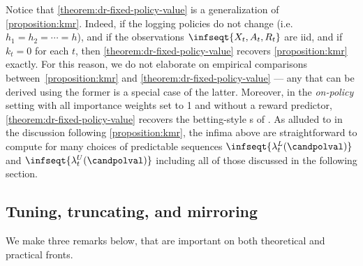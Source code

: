 Notice that \cref{theorem:dr-fixed-policy-value} is a generalization of \cref{proposition:kmr}. Indeed, if the logging policies do not change (i.e.~$h_1=h_2=\cdots=h$), and if the observations $\infseqt{X_t, A_t, R_t}$ are iid, and if $k_t = 0$ for each $t$, then \cref{theorem:dr-fixed-policy-value} recovers \cref{proposition:kmr} exactly. For this reason, we do not elaborate on empirical comparisons between~\cref{proposition:kmr} and \cref{theorem:dr-fixed-policy-value} --- any \cs{} that can be derived using the former is a special case of the latter. Moreover, in the \emph{on-policy} setting with all importance weights set to 1 and without a reward predictor, \cref{theorem:dr-fixed-policy-value} recovers the betting-style \cs{}s of \citet[Theorem 3]{waudby2020estimating}. As alluded to in the discussion following \cref{proposition:kmr}, the infima above are straightforward to compute for many choices of predictable sequences $\infseqt{\lambda_t^L(\candpolval)}$ and $\infseqt{\lambda_t^U(\candpolval)}$ including all of those discussed in the following section.

\subsection{Tuning, truncating, and mirroring}\label{section:tuning-truncating-mirroring}

We make three remarks below, that are important on both theoretical and practical fronts.

